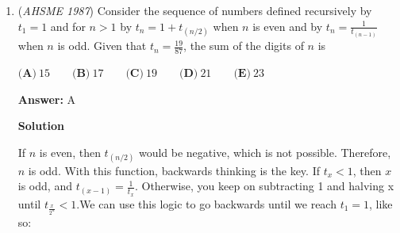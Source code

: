 \begin{enumerate}
 --$\text{lucasxia01}$



	\item (\textit{AHSME 1987}) Consider the sequence of numbers defined recursively by $t_1=1$ and for $n>1$ by $t_n=1+t_{(n/2)}$ when $n$ is even 
and by $t_n=\frac{1}{t_{(n-1)}}$ when $n$ is odd. Given that $t_n=\frac{19}{87}$, the sum of the digits of $n$ is


 $\textbf{(A)}\ 15 \qquad \textbf{(B)}\ 17 \qquad \textbf{(C)}\ 19 \qquad \textbf{(D)}\ 21 \qquad \textbf{(E)}\ 23$

 \textbf{Answer: }A



\textbf{Solution}

If $n$ is even, then $t_{(n/2)}$ would be negative, which is not possible. Therefore, $n$ is odd. With this function, backwards thinking is the key. If $t_x < 1$, then $x$ is odd, and $t_{(x-1)} = \frac{1}{t_{x}}$. Otherwise, you keep on subtracting 1 and halving x until $t_\frac{x}{2^{n}} < 1$.We can use this logic to go backwards until we reach $t_1 = 1$, like so:


\end{enumerate}
